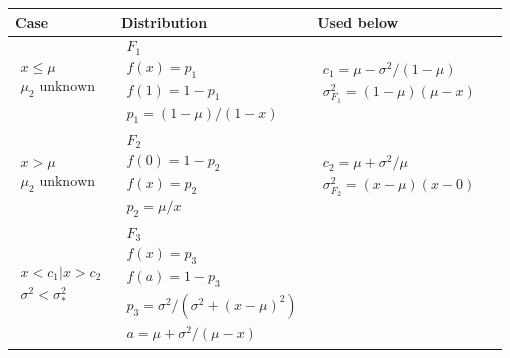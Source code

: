 \documentclass{article}
\begin{document}
\begin{table} %
\begin{tabular}{llll}
Case &Distribution &Used below
\\ \hline
$\begin{array}{l}
  x \le \mu \\
  \mu_2 \mbox{ unknown}\\
\end{array}$
  &$\begin{array}{l}
    F_{1}\\
    f(x) = p_1\\
    f(1) = 1 - p_1\\
    p_1 = (1-\mu)/(1-x)
   \end{array}$
  &$\begin{array}{l}
    c_1 = \mu - \sigma^2 / (1-\mu)\\
    \sigma_{F_1}^2 = (1-\mu)(\mu-x)
   \end{array}$

\\ \hline
$\begin{array}{l}
  x > \mu \\
  \mu_2 \mbox{ unknown}
\end{array}$
  &$\begin{array}{l}
    F_{2}\\
    f(0) = 1 - p_2\\
    f(x) = p_2\\
    p_2 = \mu / x
   \end{array}$
  &$\begin{array}{l}
    c_2 = \mu + \sigma^2 / \mu\\
    \sigma_{F_2}^2 = (x-\mu)(x - 0)
   \end{array}$

\\ \hline
$\begin{array}{l}
  x < c_1 | x > c_2 \\
  \sigma^2 < \sigma^2_*

\end{array}$
  &$\begin{array}{l}
    F_{3}\\
    f(x) = p_3\\
    f(a) = 1 - p_3\\
    p_3 = \sigma^2 / (\sigma^2 + (x-\mu)^2)\\
    a = \mu + \sigma^2/(\mu-x)
   \end{array}$


\end{tabular}
\end{table}
\end{document}
